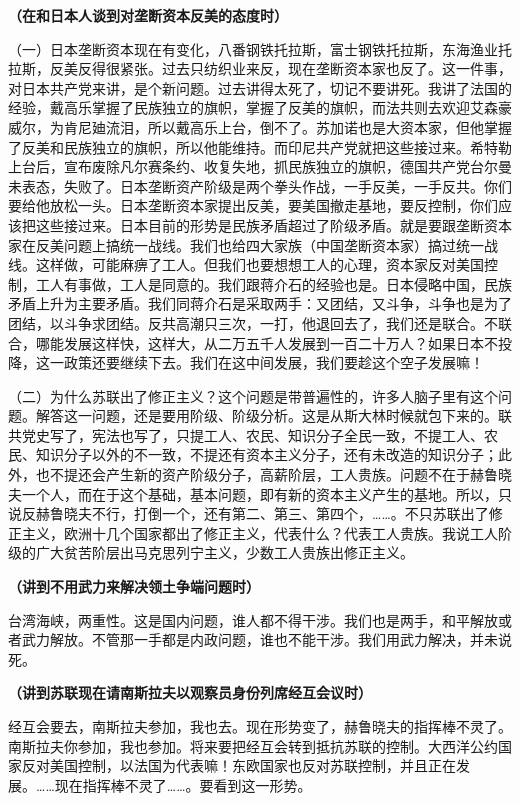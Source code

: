 \textbf{（在和日本人谈到对垄断资本反美的态度时）}

（一）日本垄断资本现在有变化，八番钢铁托拉斯，富士钢铁托拉斯，东海渔业托拉斯，反美反得很紧张。过去只纺织业来反，现在垄断资本家也反了。这一件事，对日本共产党来讲，是个新问题。过去讲得太死了，切记不要讲死。我讲了法国的经验，戴高乐掌握了民族独立的旗帜，掌握了反美的旗帜，而法共则去欢迎艾森豪威尔，为肯尼廸流泪，所以戴高乐上台，倒不了。苏加诺也是大资本家，但他掌握了反美和民族独立的旗帜，所以他能维持。而印尼共产党就把这些接过来。希特勒上台后，宣布废除凡尔赛条约、收复失地，抓民族独立的旗帜，德国共产党台尔曼未表态，失败了。日本垄断资产阶级是两个拳头作战，一手反美，一手反共。你们要给他放松一头。日本垄断资本家提出反美，要美国撤走基地，要反控制，你们应该把这些接过来。日本目前的形势是民族矛盾超过了阶级矛盾。就是要跟垄断资本家在反美问题上搞统一战线。我们也给四大家族（中国垄断资本家）搞过统一战线。这样做，可能麻痹了工人。但我们也要想想工人的心理，资本家反对美国控制，工人有事做，工人是同意的。我们跟蒋介石的经验也是。日本侵略中国，民族矛盾上升为主要矛盾。我们同蒋介石是采取两手：又团结，又斗争，斗争也是为了团结，以斗争求团结。反共高潮只三次，一打，他退回去了，我们还是联合。不联合，哪能发展这样快，这样大，从二万五千人发展到一百二十万人？如果日本不投降，这一政策还要继续下去。我们在这中间发展，我们要趁这个空子发展嘛！

（二）为什么苏联出了修正主义？这个问题是带普遍性的，许多人脑子里有这个问题。解答这一问题，还是要用阶级、阶级分析。这是从斯大林时候就包下来的。联共党史写了，宪法也写了，只提工人、农民、知识分子全民一致，不提工人、农民、知识分子以外的不一致，不提还有资本主义分子，还有未改造的知识分子；此外，也不提还会产生新的资产阶级分子，高薪阶层，工人贵族。问题不在于赫鲁晓夫一个人，而在于这个基础，基本问题，即有新的资本主义产生的基地。所以，只说反赫鲁晓夫不行，打倒一个，还有第二、第三、第四个，……。不只苏联出了修正主义，欧洲十几个国家都出了修正主义，代表什么？代表工人贵族。我说工人阶级的广大贫苦阶层出马克思列宁主义，少数工人贵族出修正主义。

\textbf{（讲到不用武力来解决领土争端问题时）}

台湾海峡，两重性。这是国内问题，谁人都不得干涉。我们也是两手，和平解放或者武力解放。不管那一手都是内政问题，谁也不能干涉。我们用武力解决，并未说死。

\textbf{（讲到苏联现在请南斯拉夫以观察员身份列席经互会议时）}

经互会要去，南斯拉夫参加，我也去。现在形势变了，赫鲁晓夫的指挥棒不灵了。南斯拉夫你参加，我也参加。将来要把经互会转到抵抗苏联的控制。大西洋公约国家反对美国控制，以法国为代表嘛！东欧国家也反对苏联控制，并且正在发展。……现在指挥棒不灵了……。要看到这一形势。

